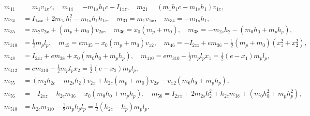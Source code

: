         \begin{equation*}
        \begin{aligned}
        m_{11} &= m_1 v_{1x} c, \quad
        m_{14} = -m_{1s} h_1 c - I_{1xz}, \quad
        m_{21} = (m_1 h_1 c - m_{1s} h_1) v_{1x}, \\
        m_{24} &= I_{1xx} + 2 m_{1s} h_1^2 - m_{1s} h_1 h_{1c}, \quad
        m_{31} = m_1 v_{1x}, \quad
        m_{34} = -m_{1s} h_1, \\
        m_{35} &= m_2 v_{2x} + (m_p + m_0) v_{2x}, \quad
        m_{36} = x_0 (m_p + m_0), \quad
        m_{38} = -m_{2s} h_2 - (m_0 h_0 + m_p h_p), \\
        m_{310} &= \frac{1}{2} m_p l_p, \quad
        m_{45} = e m_{35} - x_0 (m_p + m_0) v_{x2}, \quad
        m_{46} = -I_{2zz} + e m_{36} - \frac{1}{2} (m_p + m_0) (x_1^2 + x_2^2), \\
        m_{48} &= I_{2xz} + e m_{38} + x_0 (m_0 h_0 + m_p h_p), \quad
        m_{410} = e m_{310} - \frac{1}{2} m_p l_p x_1 = \frac{1}{2} (e - x_1) m_p l_p, \\
        m_{412} &= e m_{310} - \frac{1}{2} m_p l_p x_2 = \frac{1}{2} (e - x_2) m_p l_p, \\
        m_{55} &= (m_2 h_{2c} - m_{2s} h_2) v_{2x} + h_{2c} (m_p + m_0) v_{2x} - v_{x2} (m_0 h_0 + m_p h_p), \\
        m_{56} &= -I_{2xz} + h_{2c} m_{36} - x_0 (m_0 h_0 + m_p h_p), \quad
        m_{58} = I_{2xx} + 2 m_{2s} h_2^2 + h_{2c} m_{38} + (m_0 h_0^2 + m_p h_p^2), \\
        m_{510} &= h_{2c} m_{310} - \frac{1}{2} m_p h_p l_p = \frac{1}{2} (h_{2c} - h_p) m_p l_p.
        \end{aligned}
        \end{equation*}
